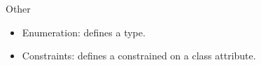 Other
\begin{itemize}
  \item Enumeration: defines a type.
  \item Constraints: defines a constrained on a class attribute.
\end{itemize}



